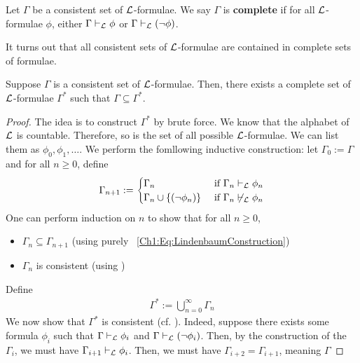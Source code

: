 \begin{boxdefinition}[Completeness]
    Let $\Gamma$ be a consistent set of $\mathcal{L}$-formulae. We say $\Gamma$ is \textbf{complete} if for all $\mathcal{L}$-formulae $\phi$, either $\Gamma \vdash_{\mathcal{L}} \phi$ or $\Gamma \vdash_{\mathcal{L}} \left( \neg \phi \right)$.
\end{boxdefinition}

It turns out that all consistent sets of $\mathcal{L}$-formulae are contained in complete sets of formulae.

\begin{boxtheorem}
    Suppose $\Gamma$ is a consistent set of $\mathcal{L}$-formulae. Then, there exists a complete set of $\mathcal{L}$-formulae $\Gamma^*$ such that $\Gamma \subseteq \Gamma^*$.
\end{boxtheorem}
\begin{proof}
    The idea is to construct $\Gamma^*$ by brute force. We know that the alphabet of $\mathcal{L}$ is countable. Therefore, so is the set of all possible $\mathcal{L}$-formulae. We can list them as $\phi_0, \phi_1, \ldots$. We perform the fomllowing inductive construction: let $\Gamma_0 := \Gamma$ and for all $n \geq 0$, define
    \begin{align}
        \Gamma_{n + 1} :=
        \begin{cases}
            \Gamma_n & \text{ if } \Gamma_n \vdash_{\mathcal{L}} \phi_n \\
            \Gamma_{n} \cup \left\{ \left( \neg \phi_n \right) \right\} & \text{ if } \Gamma_n \not\vdash_{\mathcal{L}} \phi_n
        \end{cases}
        \label{Ch1:Eq:LindenbaumConstruction}
    \end{align}
    One can perform induction on $n$ to show that for all $n \geq 0$,
    \begin{itemize}[noitemsep]
        \item $\Gamma_n \subseteq \Gamma_{n + 1}$ (using purely ~\eqref{Ch1:Eq:LindenbaumConstruction})
        \item $\Gamma_n$ is consistent (using )
    \end{itemize}
    Define
    \begin{align*}
        \Gamma^* := \bigcup_{n = 0}^{\infty} \Gamma_n
    \end{align*}
    We now show that $\Gamma^*$ is consistent (cf. ). Indeed, suppose there exists some formula $\phi_i$ such that $\Gamma \vdash_{\mathcal{L}} \phi_i$ and $\Gamma \vdash_{\mathcal{L}} \left( \neg \phi_i \right)$. Then, by the construction of the $\Gamma_i$, we must have $\Gamma_{i + 1} \vdash_{\mathcal{L}} \phi_i$. Then, we must have $\Gamma_{i + 2} = \Gamma_{i + 1}$, meaning $\Gamma_{}$
\end{proof}


